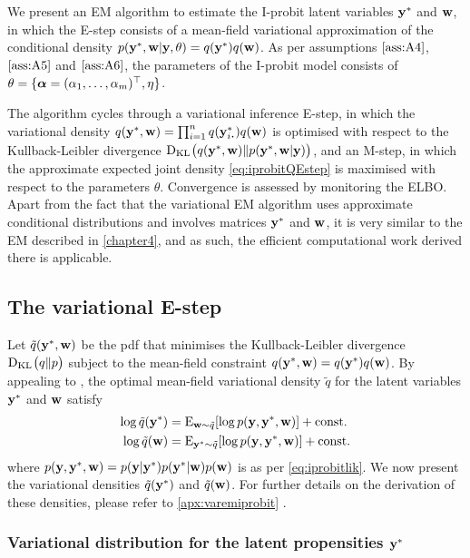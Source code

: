 We present an EM algorithm to estimate the I-probit latent variables ${\mathbf y}^*$ and ${\mathbf w}$, in which the E-step consists of a mean-field variational approximation of the conditional density $p({\mathbf y}^*,{\mathbf w}|{\mathbf y},\theta) = q({\mathbf y}^*)q({\mathbf w})$.
As per assumptions $\ref{ass:A4}$, $\ref{ass:A5}$ and $\ref{ass:A6}$, the parameters of the I-probit model consists of $\theta =\{ {\bm\alpha} = (\alpha_1,\dots,\alpha_m)^\top,\eta \}$.

The algorithm cycles through a variational inference E-step, in which the variational density $q(\by^*,\bw) = \prod_{i=1}^n q(\by^*_{i\bigcdot}) q(\bw)$ is optimised with respect to the Kullback-Leibler divergence $\operatorname{D_{KL}\hspace{-1pt}}\big( q({\mathbf y}^*,{\mathbf w}) \Vert p({\mathbf y}^*,{\mathbf w}|{\mathbf y}) \big)$, and an M-step, in which the approximate expected joint density \cref{eq:iprobitQEstep} is maximised with respect to the parameters $\theta$. 
Convergence is assessed by monitoring the ELBO.
Apart from the fact that the variational EM algorithm uses approximate conditional distributions and involves matrices ${\mathbf y}^*$ and ${\mathbf w}$, it is very similar to the EM described in \cref{chapter4}, and as such, the efficient computational work derived there is applicable.

\subsection{The variational E-step}

Let $\tilde q({\mathbf y}^*,{\mathbf w})$ be the pdf that minimises the Kullback-Leibler divergence $\operatorname{D_{KL}\hspace{-1pt}}\big( q \Vert p \big)$ subject to the mean-field constraint $q({\mathbf y}^*,{\mathbf w}) = q({\mathbf y}^*)q({\mathbf w})$.
By appealing to \citet[equation 10.9, p. 466]{bishop2006pattern}, the optimal mean-field variational density $\tilde q$ for the latent variables ${\mathbf y}^*$ and ${\mathbf w}$ satisfy
\begin{align}
  \log \tilde q({\mathbf y}^*) &= \operatorname{E}_{{\mathbf w}\sim\tilde q} [\log p({\mathbf y},{\mathbf y}^*,{\mathbf w})] + \text{const.}\hspace{0.01em} \label{eq:logqystar} \\
  \log \tilde q({\mathbf w}) &= \operatorname{E}_{{\mathbf y}^*\sim\tilde q} [\log p({\mathbf y},{\mathbf y}^*,{\mathbf w})] + \text{const.}\hspace{0.01em} \label{eq:logqw}
\end{align}
where $p({\mathbf y},{\mathbf y}^*,{\mathbf w}) = p({\mathbf y}|{\mathbf y}^*) p({\mathbf y}^*|{\mathbf w}) p({\mathbf w})$ is as per \cref{eq:iprobitlik}.
We now present the variational densities $\tilde q({\mathbf y}^*)$ and $\tilde q({\mathbf w})$.
For further details on the derivation of these densities, please refer to \cref{apx:varemiprobit} .

\subsubsection{Variational distribution for the latent propensities \texorpdfstring{${\mathbf y}^*$}{$y^*$}}

